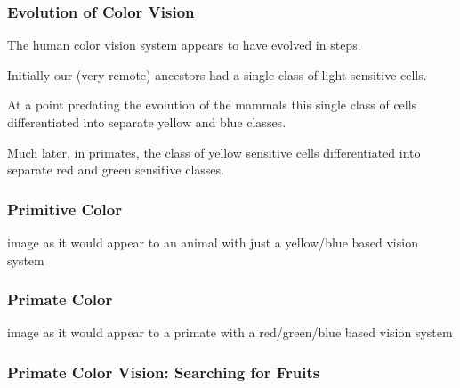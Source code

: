 \documentclass[12pt]{beamer}\usepackage[]{graphicx}\usepackage[]{color}
\begin{document}
\begin{frame}
\begin{center}
\Huge{}
\end{center}
\end{frame}


\begin{frame}
\frametitle{Evolution of Color Vision}

\bbi
  \item The human color vision system appears to have evolved in steps.
  \item Initially our (very remote) ancestors had a single class of light sensitive cells.
  \item At a point predating the evolution of the mammals this single class of cells differentiated into separate yellow and blue classes.
  \item Much later, in primates, the class of yellow sensitive cells differentiated into separate red and green sensitive classes.
\ei

\end{frame}


\begin{frame}
\frametitle{Primitive Color}
\begin{center}

{\scriptsize {\lolit image as it would appear to an animal with just 
a yellow/blue based vision system}}
\end{center}
\end{frame}


\begin{frame}
\frametitle{Primate Color}
\begin{center}

{\scriptsize {\lolit image as it would appear to a primate with 
a red/green/blue based vision system}}
\end{center}
\end{frame}


\begin{frame}
\frametitle{Primate Color Vision: Searching for Fruits}
\begin{center}
\end{center}
\end{frame}
\end{document}
